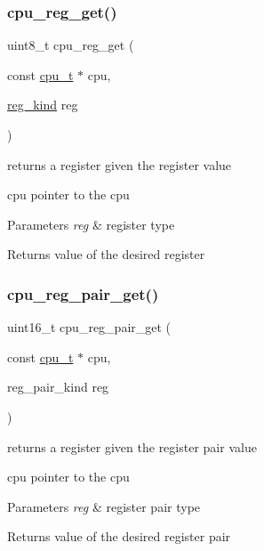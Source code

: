 \subsubsection{\texorpdfstring{cpu\+\_\+reg\+\_\+get()}{cpu\_reg\_get()}}
{\footnotesize\ttfamily uint8\+\_\+t cpu\+\_\+reg\+\_\+get (\begin{DoxyParamCaption}\item[{const \hyperlink{structcpu__t}{cpu\+\_\+t} $\ast$}]{cpu,  }\item[{\hyperlink{cpu-registers_8h_ae7a73a08aaa7af3cfe957f32ef8af9d3}{reg\+\_\+kind}}]{reg }\end{DoxyParamCaption})}



returns a register given the register value 

cpu pointer to the cpu 
\begin{DoxyParams}{Parameters}
{\em reg} & register type\\
\hline
\end{DoxyParams}
\begin{DoxyReturn}{Returns}
value of the desired register 
\end{DoxyReturn}
\mbox{\label{cpu-registers_8h_a259712cddf80a16395900832af372953}} 
\subsubsection{\texorpdfstring{cpu\+\_\+reg\+\_\+pair\+\_\+get()}{cpu\_reg\_pair\_get()}}
{\footnotesize\ttfamily uint16\+\_\+t cpu\+\_\+reg\+\_\+pair\+\_\+get (\begin{DoxyParamCaption}\item[{const \hyperlink{structcpu__t}{cpu\+\_\+t} $\ast$}]{cpu,  }\item[{reg\+\_\+pair\+\_\+kind}]{reg }\end{DoxyParamCaption})}



returns a register given the register pair value 

cpu pointer to the cpu 
\begin{DoxyParams}{Parameters}
{\em reg} & register pair type\\
\hline
\end{DoxyParams}
\begin{DoxyReturn}{Returns}
value of the desired register pair 
\end{DoxyReturn}
\mbox{\label{cpu-registers_8h_aa7482c91cfc29f6a4a1ba62127f6ea35}} 
